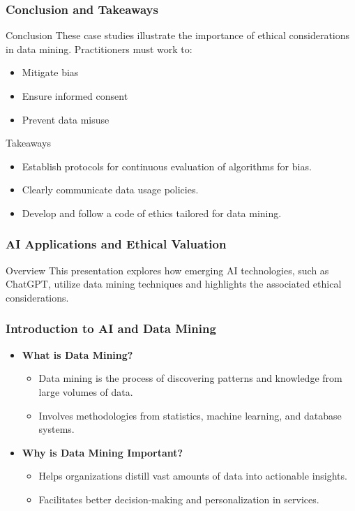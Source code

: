 \documentclass[aspectratio=169]{beamer}
\begin{document}
\begin{frame}[fragile]
    \frametitle{Conclusion and Takeaways}
    \begin{block}{Conclusion}
        These case studies illustrate the importance of ethical considerations in data mining. Practitioners must work to:
        \begin{itemize}
            \item Mitigate bias
            \item Ensure informed consent
            \item Prevent data misuse
        \end{itemize}
    \end{block}

    \begin{block}{Takeaways}
        \begin{itemize}
            \item Establish protocols for continuous evaluation of algorithms for bias.
            \item Clearly communicate data usage policies.
            \item Develop and follow a code of ethics tailored for data mining.
        \end{itemize}
    \end{block}
\end{frame}

\begin{frame}[fragile]
    \frametitle{AI Applications and Ethical Valuation}
    \begin{block}{Overview}
        This presentation explores how emerging AI technologies, such as ChatGPT, utilize data mining techniques and highlights the associated ethical considerations.
    \end{block}
\end{frame}

\begin{frame}[fragile]
    \frametitle{Introduction to AI and Data Mining}
    \begin{itemize}
        \item \textbf{What is Data Mining?}
        \begin{itemize}
            \item Data mining is the process of discovering patterns and knowledge from large volumes of data.
            \item Involves methodologies from statistics, machine learning, and database systems.
        \end{itemize}
        
        \item \textbf{Why is Data Mining Important?}
        \begin{itemize}
            \item Helps organizations distill vast amounts of data into actionable insights.
            \item Facilitates better decision-making and personalization in services.
        \end{itemize}
    \end{itemize}
\end{frame}
\end{document}
